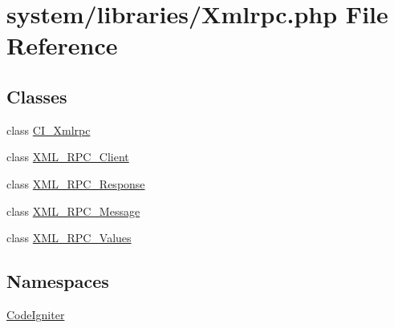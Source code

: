 \hypertarget{_xmlrpc_8php}{}\section{system/libraries/\+Xmlrpc.php File Reference}
\label{_xmlrpc_8php}
\subsection*{Classes}
\begin{DoxyCompactItemize}
\item 
class \mbox{\hyperlink{class_c_i___xmlrpc}{C\+I\+\_\+\+Xmlrpc}}
\item 
class \mbox{\hyperlink{class_x_m_l___r_p_c___client}{X\+M\+L\+\_\+\+R\+P\+C\+\_\+\+Client}}
\item 
class \mbox{\hyperlink{class_x_m_l___r_p_c___response}{X\+M\+L\+\_\+\+R\+P\+C\+\_\+\+Response}}
\item 
class \mbox{\hyperlink{class_x_m_l___r_p_c___message}{X\+M\+L\+\_\+\+R\+P\+C\+\_\+\+Message}}
\item 
class \mbox{\hyperlink{class_x_m_l___r_p_c___values}{X\+M\+L\+\_\+\+R\+P\+C\+\_\+\+Values}}
\end{DoxyCompactItemize}
\subsection*{Namespaces}
\begin{DoxyCompactItemize}
\item 
 \mbox{\hyperlink{namespace_code_igniter}{Code\+Igniter}}
\end{DoxyCompactItemize}
